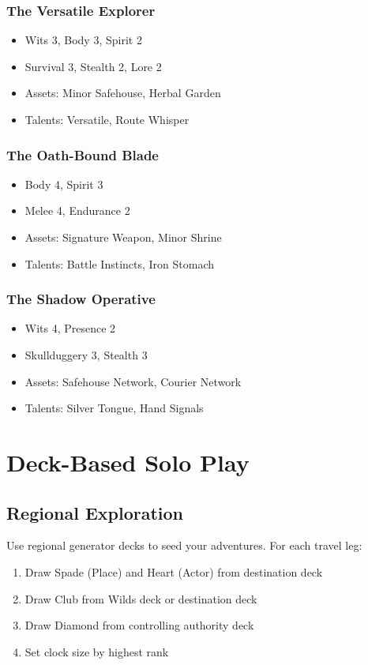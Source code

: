 \documentclass[11pt]{article}
\begin{document}
\subsubsection{The Versatile Explorer}
\begin{itemize}
    \item Wits 3, Body 3, Spirit 2
    \item Survival 3, Stealth 2, Lore 2
    \item Assets: Minor Safehouse, Herbal Garden
    \item Talents: Versatile, Route Whisper
\end{itemize}

\subsubsection{The Oath-Bound Blade}
\begin{itemize}
    \item Body 4, Spirit 3
    \item Melee 4, Endurance 2
    \item Assets: Signature Weapon, Minor Shrine
    \item Talents: Battle Instincts, Iron Stomach
\end{itemize}

\subsubsection{The Shadow Operative}
\begin{itemize}
    \item Wits 4, Presence 2
    \item Skullduggery 3, Stealth 3
    \item Assets: Safehouse Network, Courier Network
    \item Talents: Silver Tongue, Hand Signals
\end{itemize}

\section{Deck-Based Solo Play}

\subsection{Regional Exploration}

Use regional generator decks to seed your adventures. For each travel leg:

\begin{enumerate}
    \item Draw Spade (Place) and Heart (Actor) from destination deck
    \item Draw Club from Wilds deck or destination deck
    \item Draw Diamond from controlling authority deck
    \item Set clock size by highest rank
\end{enumerate}
\end{document}
